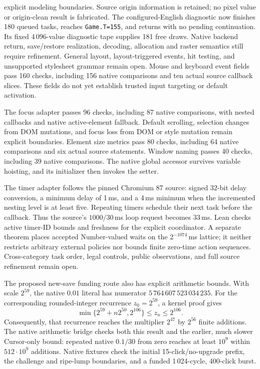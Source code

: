 \documentclass[11pt,a4paper]{article}
\numberwithin{equation}{section}
\theoremstyle{definition}
\theoremstyle{remark}
\begin{document}
explicit modeling boundaries. Source origin information is retained; no pixel value or origin-clean result is fabricated. The configured-English diagnostic now finishes 180 queued tasks, reaches \texttt{Game.T=155}, and returns with no pending continuation. Its fixed 4\,096-value diagnostic tape supplies 181 free draws. Native backend return, save/restore realization, decoding, allocation and raster semantics still require refinement. General layout, layout-triggered events, hit testing, and unsupported stylesheet grammar remain open. Mouse and keyboard event fields pass 160 checks, including 156 native comparisons and ten actual source callback slices. These fields do not yet establish trusted input targeting or default activation.

The focus adapter passes 96 checks, including 87 native comparisons, with nested callbacks and native active-element fallback. Default scrolling, selection changes from DOM mutations, and focus loss from DOM or style mutation remain explicit boundaries. Element size metrics pass 80 checks, including 64 native comparisons and six actual source statements. Window naming passes 40 checks, including 39 native comparisons. The native global accessor survives variable hoisting, and its initializer then invokes the setter.

The timer adapter follows the pinned Chromium 87 source: signed 32-bit delay conversion, a minimum delay of 1\,ms, and a 4\,ms minimum when the incremented nesting level is at least five. Repeating timers schedule their next task before the callback. Thus the source's $1000/30$\,ms loop request becomes 33\,ms. Lean checks active timer-ID bounds and freshness for the explicit coordinator. A separate theorem places accepted Number-valued waits on the $2^{-1074}$\,ms lattice; it neither restricts arbitrary external policies nor bounds finite zero-time action sequences. Cross-category task order, legal controls, public observations, and full source refinement remain open.

The proposed new-save funding route also has explicit arithmetic bounds. With scale $2^{59}$, the native $0.01$ literal has numerator $5\,764\,607\,523\,034\,235$. For the corresponding rounded-integer recurrence $z_0=2^{59}$, a kernel proof gives
\[
 \min\{2^{59}+n2^{50},2^{106}\}\le z_n\le2^{106}.
\]
Consequently, that recurrence reaches the multiplier $2^{47}$ by $2^{56}$ finite additions. The native arithmetic bridge checks both this result and the earlier, much slower Cursor-only bound: repeated native $0.1/30$ from zero reaches at least $10^9$ within $512\cdot10^9$ additions. Native fixtures check the initial 15-click/no-upgrade prefix, the challenge and ripe-lump boundaries, and a funded 1\,024-cycle, 400-click burst.
\end{document}

